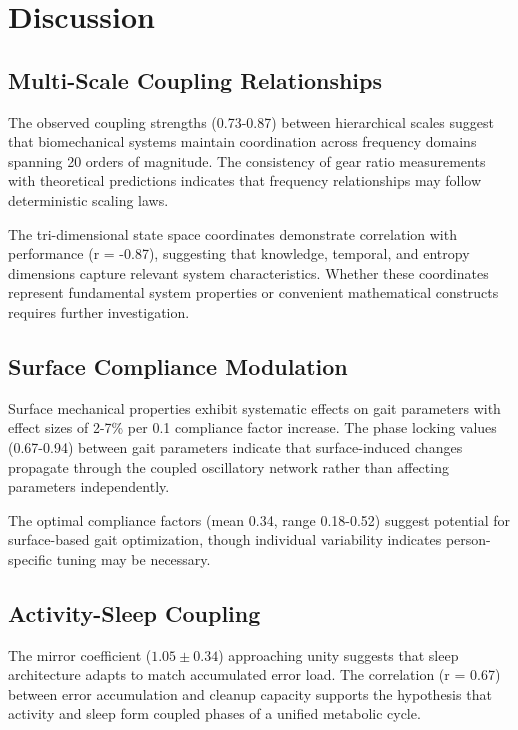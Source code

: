 \documentclass[12pt,twocolumn]{article}
\begin{document}
\section{Discussion}

\subsection{Multi-Scale Coupling Relationships}

The observed coupling strengths (0.73-0.87) between hierarchical scales suggest that biomechanical systems maintain coordination across frequency domains spanning 20 orders of magnitude. The consistency of gear ratio measurements with theoretical predictions indicates that frequency relationships may follow deterministic scaling laws.

The tri-dimensional state space coordinates demonstrate correlation with performance (r = -0.87), suggesting that knowledge, temporal, and entropy dimensions capture relevant system characteristics. Whether these coordinates represent fundamental system properties or convenient mathematical constructs requires further investigation.

\subsection{Surface Compliance Modulation}

Surface mechanical properties exhibit systematic effects on gait parameters with effect sizes of 2-7\% per 0.1 compliance factor increase. The phase locking values (0.67-0.94) between gait parameters indicate that surface-induced changes propagate through the coupled oscillatory network rather than affecting parameters independently.

The optimal compliance factors (mean 0.34, range 0.18-0.52) suggest potential for surface-based gait optimization, though individual variability indicates person-specific tuning may be necessary.

\subsection{Activity-Sleep Coupling}

The mirror coefficient ($1.05 \pm 0.34$) approaching unity suggests that sleep architecture adapts to match accumulated error load. The correlation (r = 0.67) between error accumulation and cleanup capacity supports the hypothesis that activity and sleep form coupled phases of a unified metabolic cycle.
\end{document}

